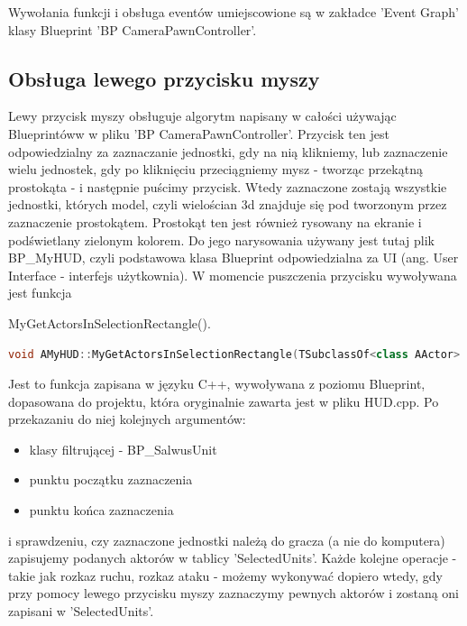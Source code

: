 \documentclass[12pt]{report}
\begin{document}
Wywołania funkcji i obsługa eventów umiejscowione są w zakładce 'Event Graph' klasy Blueprint 'BP CameraPawnController'.

\subsection{Obsługa lewego przycisku myszy}

Lewy przycisk myszy obsługuje algorytm napisany w całości używając Blueprintóww w pliku 'BP CameraPawnController'. Przycisk ten jest odpowiedzialny za zaznaczanie jednostki, gdy na nią klikniemy, lub zaznaczenie wielu jednostek, gdy po kliknięciu przeciągniemy mysz - tworząc przekątną prostokąta - i następnie puścimy przycisk. Wtedy zaznaczone zostają wszystkie jednostki, których model, czyli wielościan 3d znajduje się pod tworzonym przez zaznaczenie prostokątem. Prostokąt ten jest również rysowany na ekranie i podświetlany zielonym kolorem. Do jego narysowania używany jest tutaj plik BP\_MyHUD, czyli podstawowa klasa Blueprint odpowiedzialna za UI (ang. User Interface - interfejs użytkownia). W momencie puszczenia przycisku wywoływana jest funkcja 

MyGetActorsInSelectionRectangle().
\begin{lstlisting}[language=C++, backgroundcolor=\color{black!5}, basicstyle=\footnotesize, caption=Funkcja MyGetActorsInSelectionRectangle() w klasie MyHUD.]
void AMyHUD::MyGetActorsInSelectionRectangle(TSubclassOf<class AActor> ClassFilter, const FVector2D& FirstPoint, const FVector2D& SecondPoint, TArray<AActor*>& OutActors)
\end{lstlisting}

Jest to funkcja zapisana w języku C++, wywoływana z poziomu Blueprint, dopasowana do projektu, która oryginalnie zawarta jest w pliku HUD.cpp. Po przekazaniu do niej kolejnych argumentów: 
\begin{itemize}
\item[--] klasy filtrującej - BP\_SalwusUnit
\item[--] punktu początku zaznaczenia 
\item[--] punktu końca zaznaczenia
\end{itemize}

i sprawdzeniu, czy zaznaczone jednostki należą do gracza (a nie do komputera) zapisujemy podanych aktorów w tablicy 'SelectedUnits'. Każde kolejne operacje - takie jak rozkaz ruchu, rozkaz ataku - możemy wykonywać dopiero wtedy, gdy przy pomocy lewego przycisku myszy zaznaczymy pewnych aktorów i zostaną oni zapisani w 'SelectedUnits'. 
\end{document}
